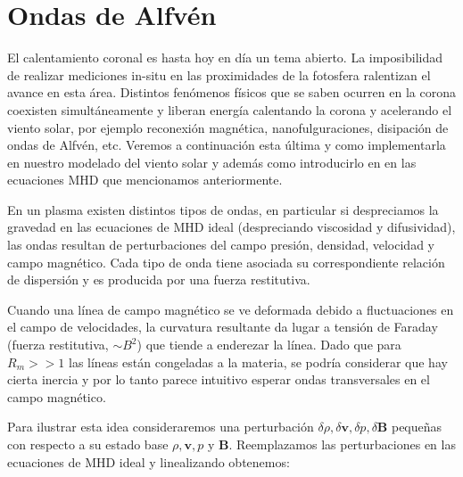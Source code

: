 \documentclass[a4paper,11pt]{report}
\begin{document}
\section{Ondas de Alfvén}\label{seccion_alfven}

El calentamiento coronal es hasta hoy en día un tema abierto. La imposibilidad de realizar mediciones in-situ en las proximidades de la fotosfera ralentizan el avance en esta área. Distintos fenómenos físicos que se saben ocurren en la corona coexisten simultáneamente y liberan energía calentando la corona y acelerando el viento solar, por ejemplo reconexión magnética, nanofulguraciones, disipación de ondas de Alfvén, etc. Veremos a continuación esta última y como implementarla en nuestro modelado del viento solar y además como introducirlo en en las ecuaciones MHD que mencionamos anteriormente.


En un plasma existen distintos tipos de ondas, en particular si despreciamos la gravedad en las ecuaciones de MHD ideal (despreciando viscosidad y difusividad), las ondas resultan de perturbaciones del campo presión, densidad, velocidad y campo magnético. Cada tipo de onda tiene asociada su correspondiente relación de dispersión y es producida por una fuerza restitutiva. %

Cuando una línea de campo magnético se ve deformada debido a fluctuaciones en el campo de velocidades, la curvatura resultante da lugar a tensión de Faraday (fuerza restitutiva, $\sim B^2$) que tiende a enderezar la línea. Dado que para $R_m >> 1$ las líneas están congeladas a la materia, se podría considerar que hay cierta inercia y por lo tanto parece intuitivo esperar ondas transversales en el campo magnético. 




Para ilustrar esta idea consideraremos una perturbación $\delta \rho, \delta \boldsymbol{v},\delta p, \delta \boldsymbol{B}$ pequeñas con respecto a su estado base $\rho,  \boldsymbol{v}, p$ y $\boldsymbol{B}$. Reemplazamos las perturbaciones en las ecuaciones de MHD ideal y linealizando obtenemos:
\end{document}
